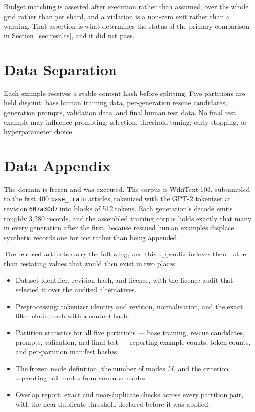 Budget matching is asserted after execution rather than assumed, over the whole grid rather
than per shard, and a violation is a non-zero exit rather than a warning. That assertion is
what determines the status of the primary comparison in Section~\ref{sec:results}, and it
did not pass.

\section{Data Separation}
\label{app:separation}

Each example receives a stable content hash before splitting. Five partitions are held
disjoint: base human training data, per-generation rescue candidates, generation prompts,
validation data, and final human test data. No final test example may influence prompting,
selection, threshold tuning, early stopping, or hyperparameter choice.

\section{Data Appendix}
\label{app:data}

The domain is frozen and was executed. The corpus is WikiText-103, subsampled to
the first 400 \texttt{base\_train} articles, tokenized with the GPT-2 tokenizer at
revision \texttt{607a30d7} into blocks of 512 tokens. Each generation's decode
emits roughly 3{,}280 records, and the assembled training corpus holds exactly that
many in every generation after the first, because rescued human examples displace
synthetic records one for one rather than being appended.

The released artifacts carry the following, and this appendix indexes them rather
than restating values that would then exist in two places:

\begin{itemize}
  \item Dataset identifier, revision hash, and licence, with the licence audit
    that selected it over the audited alternatives.
  \item Preprocessing: tokenizer identity and revision, normalisation, and the
    exact filter chain, each with a content hash.
  \item Partition statistics for all five partitions --- base training, rescue
    candidates, prompts, validation, and final test --- reporting example counts,
    token counts, and per-partition manifest hashes.
  \item The frozen mode definition, the number of modes $M$, and the criterion
    separating tail modes from common modes.
  \item Overlap report: exact and near-duplicate checks across every partition
    pair, with the near-duplicate threshold declared before it was applied.
\end{itemize}

